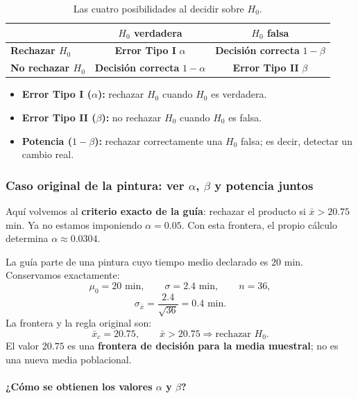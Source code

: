 \documentclass[11pt,a4paper]{article}
\begin{document}
\begin{table}[H]
\centering
\renewcommand{\arraystretch}{1.35}
\begin{tabular}{p{3.6cm}cc}
\toprule
 & \textbf{$H_0$ verdadera} & \textbf{$H_0$ falsa}\\
\midrule
\textbf{Rechazar $H_0$} & \cellcolor{rejectred!16}\textbf{Error Tipo I} $\alpha$ & \cellcolor{accentgreen!14}\textbf{Decisión correcta} $1-\beta$\\
\textbf{No rechazar $H_0$} & \cellcolor{acceptblue!12}\textbf{Decisión correcta} $1-\alpha$ & \cellcolor{altorange!16}\textbf{Error Tipo II} $\beta$\\
\bottomrule
\end{tabular}
\caption{Las cuatro posibilidades al decidir sobre $H_0$.}
\end{table}

\begin{itemize}
\item \textbf{Error Tipo I ($\alpha$):} rechazar $H_0$ cuando $H_0$ es verdadera.
\item \textbf{Error Tipo II ($\beta$):} no rechazar $H_0$ cuando $H_0$ es falsa.
\item \textbf{Potencia ($1-\beta$):} rechazar correctamente una $H_0$ falsa; es decir, detectar un cambio real.
\end{itemize}

\subsubsection*{Caso original de la pintura: ver $\alpha$, $\beta$ y potencia juntos}

\begin{aclaracion}
Aquí volvemos al \textbf{criterio exacto de la guía}: rechazar el producto si $\bar{x}>20.75$ min. Ya no estamos imponiendo $\alpha=0.05$. Con esta frontera, el propio cálculo determina $\alpha\approx0.0304$.
\end{aclaracion}

La guía parte de una pintura cuyo tiempo medio declarado es $20$ min. Conservamos exactamente:
\[
\mu_0=20\text{ min},\qquad
\sigma=2.4\text{ min},\qquad n=36,
\]
\[
\sigma_{\bar{x}}=\frac{2.4}{\sqrt{36}}=0.4\text{ min}.
\]
La frontera y la regla original son:
\[
\bar{x}_c=20.75,
\qquad
\boxed{\bar{x}>20.75\Rightarrow\text{rechazar }H_0}.
\]
El valor $20.75$ es una \textbf{frontera de decisión para la media muestral}; no es una nueva media poblacional.

\paragraph{¿Cómo se obtienen los valores $\alpha$ y $\beta$?}
\end{document}

